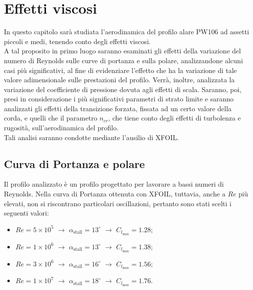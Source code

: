 \chapter{Effetti viscosi}

In questo capitolo sarà studiata l’aerodinamica del profilo alare  PW106 ad assetti piccoli e medi, tenendo conto degli effetti viscosi. \\ A tal proposito in primo luogo saranno esaminati gli effetti della variazione del numero di Reynolds sulle curve di portanza e sulla polare, analizzandone alcuni casi più significativi, al fine di evidenziare l’effetto che ha la variazione di tale valore adimensionale sulle prestazioni del profilo. Verrà, inoltre, analizzata la variazione del coefficiente di pressione dovuta agli effetti di scala. Saranno, poi, presi in considerazione i più significativi parametri di strato limite e saranno analizzati gli effetti della transizione forzata, fissata ad un certo valore della corda, e quelli che il parametro $n_{cr}$, che tiene conto degli effetti di turbolenza e rugosità, sull’aerodinamica del profilo.\\
Tali analisi saranno condotte mediante l’ausilio di XFOIL. 

\section{Curva di Portanza e polare}

Il profilo analizzato è un profilo progettato per lavorare a bassi numeri di Reynolds. Nella curva di Portanza ottenuta con XFOIL, tuttavia, anche a $Re$ più elevati, non si riscontrano particolari oscillazioni, pertanto sono stati scelti i seguenti valori: \\

\begin {itemize}
\item $Re=5\times10^5  $ ${\to}$ $ {\alpha}_\mathrm{stall}=13^\circ$  ${\to}$ $C_{l_\mathrm{max}}=1.28$;
\item $Re=1\times10^6$ ${\to}$ $ {\alpha}_\mathrm{stall}=13^\circ$  ${\to}$ $C_{l_\mathrm{max}}=1.38$;
\item $Re=3\times10^6$ ${\to}$ $ {\alpha}_\mathrm{stall}=16^\circ$  ${\to}$ $C_{l_\mathrm{max}}=1.56$;
\item $Re=1\times10^7$ ${\to}$ $ {\alpha}_\mathrm{stall}=18^\circ$  ${\to}$ $C_{l_\mathrm{max}}=1.76$.
\end{itemize}

